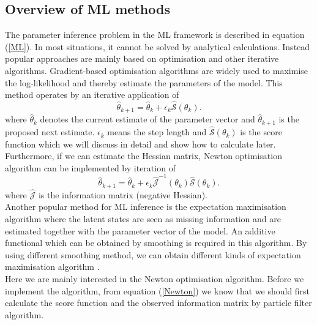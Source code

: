 \documentclass[mstat,12pt]{unswthesis}  %
\numberwithin{equation}{section}
\begin{document}
\subsection{Overview of ML methods }
The parameter inference problem in the ML framework is
described in equation (\ref{ML}). In most situations,
it cannot be solved by
analytical calculations. Instead popular approaches are mainly based on optimisation and
other iterative algorithms.
Gradient-based optimisation
algorithms \cite{poyiadjis2011particle,yildirim2015parameter} are widely used to maximise the log-likelihood and thereby estimate the parameters of
the model. This method operates by an iterative application of
\begin{equation}\widehat{\theta}_{k+1}=\widehat{\theta}_{k}+\epsilon_{k} \widehat{\mathcal{S}}\left(\theta_{k}\right).\end{equation}
where $\widehat{\theta}_{k}$ denotes the current estimate of the parameter vector and $\widehat{\theta}_{k+1}$ is the proposed next estimate. 
$\epsilon_{k}$ means the step length and $\widehat{\mathcal{S}}\left(\theta_{k}\right)$ is the score function which we will discuss in detail and show how to calculate later.
Furthermore, if we can estimate the Hessian matrix,
Newton optimisation algorithm can be implemented by
iteration of
\begin{equation}\label{Newton}
\widehat{\theta}_{k+1}=\widehat{\theta}_{k}+\epsilon_{k} \widehat{\mathcal{J}}^{-1}\left(\theta_{k}\right) \widehat{\mathcal{S}}\left(\theta_{k}\right).\end{equation}
where $\widehat{\mathcal{J}}$ is the information matrix (negative Hessian).\\

\noindent Another popular method for ML inference
is the expectation maximisation algorithm where
the latent states are seen as missing information and are estimated together with
the parameter vector of the model. An additive functional
which can be obtained by smoothing is required in this algorithm. 
By using different smoothing method, we can obtain different kinds of expectation maximisation algorithm   
\cite{del2010forward,lindsten2013backward,schon2011system}.\\


\noindent Here we are mainly interested in the Newton optimisation algorithm. Before we implement the algorithm, from equation
(\ref{Newton}) we know that we should first calculate the score function and the observed information
matrix by particle filter algorithm.\\
\end{document}
